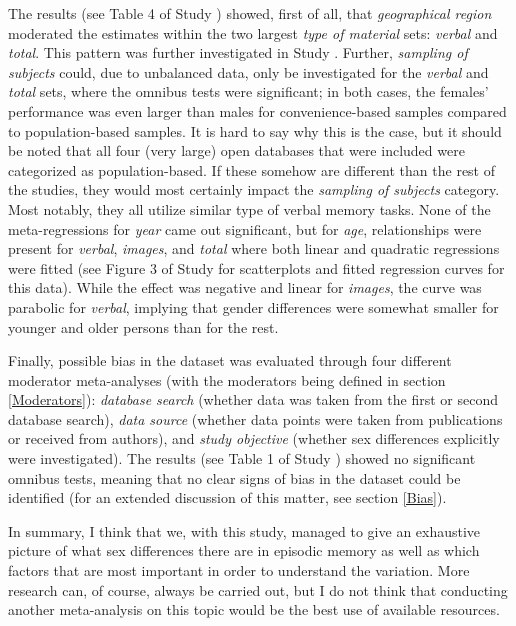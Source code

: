 The results (see Table 4 of Study ) showed, first of all, that \emph{geographical region} moderated the estimates within the two largest \emph{type of material} sets: \emph{verbal} and \emph{total}. This pattern was further investigated in Study . Further, \emph{sampling of subjects} could, due to unbalanced data, only be investigated for the \emph{verbal} and \emph{total} sets, where the omnibus tests were significant; in both cases, the females' performance was even larger than males for convenience-based samples compared to population-based samples. It is hard to say why this is the case, but it should be noted that all four (very large) open databases that were included were categorized as population-based. If these  somehow are different than the rest of the studies, they would most certainly impact the \emph{sampling of subjects} category. Most notably, they all utilize similar type of verbal memory tasks. None of the meta-regressions for \emph{year} came out significant, but for \emph{age}, relationships were present for \emph{verbal}, \emph{images}, and \emph{total} where both linear and quadratic regressions were fitted (see Figure 3 of Study  for scatterplots and fitted regression curves for this data). While the effect was negative and linear for \emph{images}, the curve was parabolic for \emph{verbal}, implying that gender differences were somewhat smaller for younger and older persons than for the rest.

Finally, possible bias in the dataset was evaluated through four different moderator meta-analyses (with the moderators being defined in section \ref{Moderators}): \emph{database search} (whether data was taken from the first or second database search), \emph{data source} (whether data points were taken from publications or received from authors), and \emph{study objective} (whether sex differences explicitly were investigated). The results (see Table 1 of Study ) showed no significant omnibus tests, meaning that no clear signs of bias in the dataset could be identified (for an extended discussion of this matter, see section \ref{Bias}).


In summary, I think that we, with this study, managed to give an exhaustive picture of what sex differences there are in episodic memory as well as which factors that are most important in order to understand the variation. More research can, of course, always be carried out, but I do not think that conducting another meta-analysis on this topic would be the best use of available resources.

